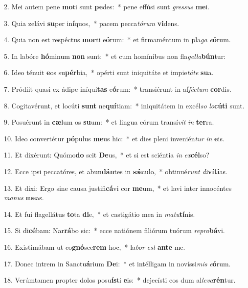 2. Mei autem pene \textbf{mo}ti sunt \textbf{pe}des:~*  pene effúsi sunt \textit{gres}\textit{sus} \textbf{me}i.\

3. Quia zelávi \textbf{su}per in\textbf{í}quos,~*  pacem pecca\textit{tó}\textit{rum} \textbf{vi}dens.\

4. Quia non est respéctus \textbf{mor}ti e\textbf{ó}rum:~*  et firmaméntum in pla\textit{ga} \textit{e}\textbf{ó}rum.\

5. In labóre \textbf{hó}minum \textbf{non} sunt:~*  et cum homínibus non fla\textit{gel}\textit{la}\textbf{bún}tur:\

6. Ideo ténuit \textbf{e}os su\textbf{pér}bia,~*  opérti sunt iniquitáte et impie\textit{tá}\textit{te} \textbf{su}a.\

7. Pródiit quasi ex ádipe iníqui\textbf{tas} e\textbf{ó}rum:~*  transiérunt in af\textit{féc}\textit{tum} \textbf{cor}dis.\

8. Cogitavérunt, et locúti \textbf{sunt} ne\textbf{quí}tiam:~*  iniquitátem in excél\textit{so} \textit{lo}\textbf{cú}\textbf{ti} sunt.\

9. Posuérunt in \textbf{cæ}lum os \textbf{su}um:~*  et lingua eórum transí\textit{vit} \textit{in} \textbf{ter}ra.\

10. Ideo convertétur \textbf{pó}pulus \textbf{me}us hic:~*  et dies pleni invenién\textit{tur} \textit{in} \textbf{e}is.\

11. Et dixérunt: Quómo\textbf{do} scit \textbf{De}us,~*  et si est sciéntia \textit{in} \textit{ex}\textbf{cél}so?\

12. Ecce ipsi peccatóres, et abun\textbf{dán}tes in \textbf{sǽ}culo,~*  obtinué\textit{runt} \textit{di}\textbf{ví}\textbf{ti}as.\

13. Et dixi: Ergo sine causa justifi\textbf{cá}vi cor \textbf{me}um,~*  et lavi inter innocéntes \textit{ma}\textit{nus} \textbf{me}as.\

14. Et fui flagellátus \textbf{to}ta \textbf{di}e,~*  et castigátio mea in \textit{ma}\textit{tu}\textbf{tí}nis.\

15. Si di\textbf{cé}bam: Nar\textbf{rá}bo sic:~*  ecce natiónem filiórum tuórum \textit{re}\textit{pro}\textbf{bá}vi.\

16. Existimábam ut co\textbf{gnó}sce\textbf{rem} hoc,~*  la\textit{bor} \textit{est} \textbf{an}\textbf{te} me.\

17. Donec intrem in Sanctu\textbf{á}rium \textbf{De}i:~*  et intélligam in novíssi\textit{mis} \textit{e}\textbf{ó}rum.\

18. Verúmtamen propter dolos posu\textbf{ís}ti \textbf{e}is:~*  dejecísti eos dum al\textit{le}\textit{va}\textbf{rén}tur.\

